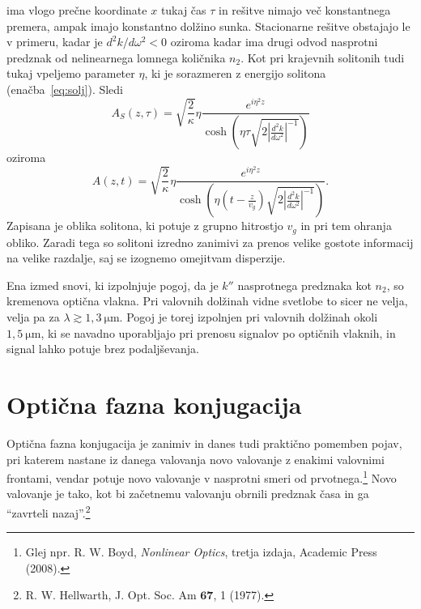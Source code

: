 ima vlogo prečne koordinate $x$ tukaj čas $\tau$ in rešitve nimajo več konstantnega premera,
ampak imajo konstantno dolžino sunka. Stacionarne rešitve obstajajo le v primeru, kadar je  $d^{2}k/d\omega^{2}<0$ oziroma kadar ima drugi odvod nasprotni predznak od nelinearnega lomnega količnika $n_2$. Kot pri krajevnih solitonih tudi tukaj vpeljemo parameter $\eta$, ki je sorazmeren 
z energijo solitona (enačba~\ref{eq:solj}). Sledi 
\begin{equation}
A_S\left(z,\tau\right)=\sqrt{\frac{2}{\kappa}}\eta\frac{e^{i\eta^{2}z}}{{\cosh}\left(\eta \tau 
\sqrt{2\left|\frac{d^{2}k}{d\omega^{2}}\right|^{-1}}\right)}
\end{equation}
oziroma
\begin{equation}
A\left(z,t\right)=\sqrt{\frac{2}{\kappa}}\eta\frac{e^{i\eta^{2}z}}{{\cosh}\left(\eta (t-\frac{z}{v_g}) 
\sqrt{2\left|\frac{d^{2}k}{d\omega^{2}}\right|^{-1}}\right)}.
\label{8.96}
\end{equation}
Zapisana je oblika solitona, ki potuje z grupno hitrostjo $v_g$ in pri tem ohranja obliko. Zaradi tega
so solitoni izredno zanimivi za prenos velike gostote informacij na velike razdalje, saj se izognemo
omejitvam disperzije. 

\begin{remark}
Ena izmed snovi, ki izpolnjuje pogoj, da je $k''$ nasprotnega predznaka kot $n_2$, so kremenova 
optična vlakna. Pri valovnih dolžinah vidne svetlobe to sicer ne velja, velja pa za 
$\lambda \gtrsim 1,3~\si{\micro\metre}$.
Pogoj je torej izpolnjen pri valovnih dolžinah okoli $1,5~\si{\micro\metre}$, ki se navadno uporabljajo 
pri prenosu signalov po optičnih vlaknih, in signal lahko potuje brez podaljševanja. 
\end{remark}

\section{Optična fazna konjugacija}
Optična fazna konjugacija je zanimiv in danes tudi praktično pomemben
pojav, pri katerem nastane iz danega valovanja novo valovanje z enakimi valovnimi
frontami, vendar potuje novo valovanje v nasprotni smeri od prvotnega.\footnote{Glej npr. R.
W. Boyd, {\it Nonlinear Optics}, tretja izdaja, Academic Press (2008).} Novo valovanje je tako,
kot bi začetnemu valovanju obrnili predznak časa in ga ``zavrteli nazaj''.\footnote{R. W. Hellwarth, 
J. Opt. Soc. Am $\mathbf{67}$, 1 (1977).}

